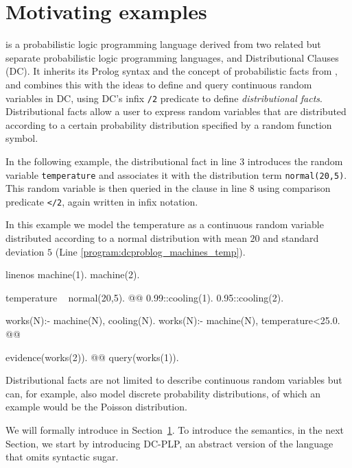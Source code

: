 \section{Motivating examples}
\dcproblogsty is a probabilistic logic programming language derived from two related but separate probabilistic logic programming languages,  \problogsty and Distributional Clauses (DC).
It inherits its Prolog syntax and the concept of probabilistic facts from \problogsty, and combines this with the ideas to define and query continuous random variables in DC, using DC's infix 
\probloginline{~}\lstinline[columns=fixed]|/2| predicate to define  {\em distributional facts}. Distributional facts allow a user to express random variables that are distributed according to a certain probability distribution specified by a random function symbol.

In the following example, the distributional fact in line 3 introduces the random variable \verb|temperature| and associates it with the distribution term \verb|normal(20,5)|. This random variable is then queried in the clause in line 8 using comparison predicate \verb|</2|, again written in infix notation. 
\begin{example}\label{example:dcproblog_machine}
	In this example we model the temperature as a continuous random variable distributed according to a normal distribution with mean $20$ and standard deviation $5$ (Line \ref{program:dcproblog_machines_temp}).
	\begin{problog*}{linenos}
machine(1). machine(2).

temperature ~ normal(20,5). @\label{program:dcproblog_machines_temp}@
0.99::cooling(1).
0.95::cooling(2).

works(N):- machine(N), cooling(N).
works(N):- machine(N), temperature<25.0. @\label{program:dcproblog_machines_work_temp}@

evidence(works(2)).  @\label{program:dcproblog_machines_evidence}@
query(works(1)).
	\end{problog*}
\end{example}


Distributional facts are not limited to describe continuous random variables but can, for example, also model discrete probability distributions, of which an example would be the Poisson distribution.

We will formally introduce \dcproblogsty in Section~\ref{}. To introduce the semantics, in the next Section, we start by introducing DC-PLP, an abstract version of the language that omits syntactic sugar. 



